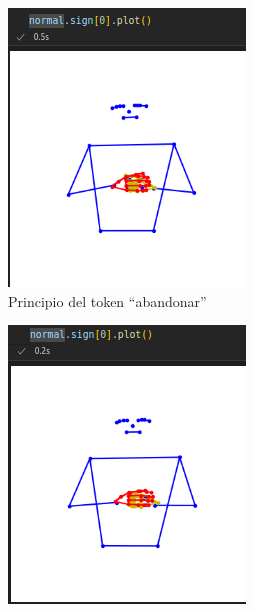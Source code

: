\begin{figure}[t]
\centering
	\begin{subfigure}[t]{0.3\textwidth}
		\centering
		\includegraphics[align=t,width=0.9\linewidth, height =0.9\linewidth]{Graphics/principio_abandonar.png}
		\caption{Principio del token ``abandonar''}
		\label{f:principio_variable_abandonar}
	\end{subfigure}
		\begin{subfigure}[t]{0.3\textwidth}
		\centering
		\includegraphics[align=t,width=0.9\linewidth, height =0.9\linewidth]{Graphics/principio_aborto.png}

\end{subfigure}
\end{figure}
